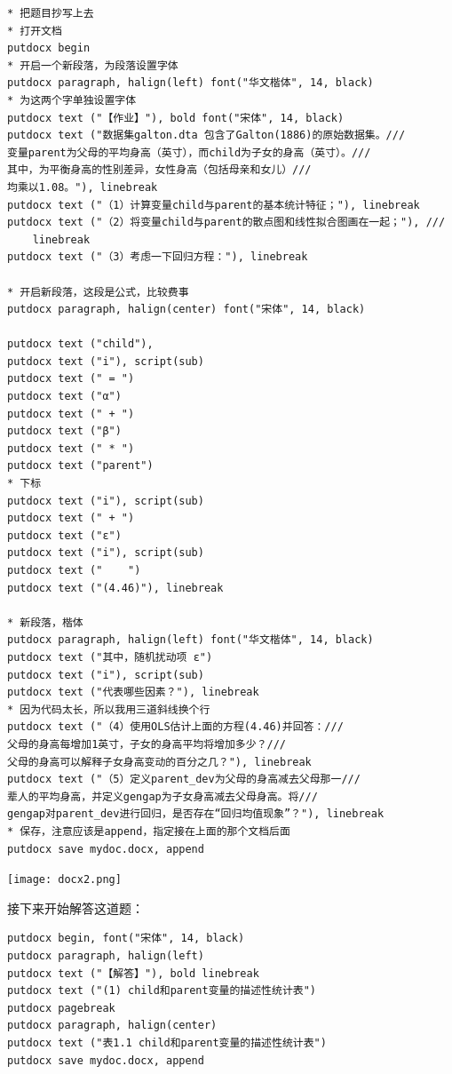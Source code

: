 \documentclass[cn,fancy,blue,11pt]{elegantbook}
\begin{document}
\begin{lstlisting}
* 把题目抄写上去
* 打开文档
putdocx begin
* 开启一个新段落，为段落设置字体
putdocx paragraph, halign(left) font("华文楷体", 14, black)
* 为这两个字单独设置字体
putdocx text ("【作业】"), bold font("宋体", 14, black)
putdocx text ("数据集galton.dta 包含了Galton(1886)的原始数据集。///
变量parent为父母的平均身高（英寸），而child为子女的身高（英寸）。///
其中，为平衡身高的性别差异，女性身高（包括母亲和女儿）///
均乘以1.08。"), linebreak
putdocx text ("（1）计算变量child与parent的基本统计特征；"), linebreak
putdocx text ("（2）将变量child与parent的散点图和线性拟合图画在一起；"), ///
    linebreak
putdocx text ("（3）考虑一下回归方程："), linebreak

* 开启新段落，这段是公式，比较费事
putdocx paragraph, halign(center) font("宋体", 14, black)

putdocx text ("child"),
putdocx text ("i"), script(sub)
putdocx text (" = ")
putdocx text ("α")
putdocx text (" + ")
putdocx text ("β")
putdocx text (" * ")
putdocx text ("parent")
* 下标
putdocx text ("i"), script(sub)
putdocx text (" + ")
putdocx text ("ε")
putdocx text ("i"), script(sub)
putdocx text ("    ")
putdocx text ("(4.46)"), linebreak

* 新段落，楷体
putdocx paragraph, halign(left) font("华文楷体", 14, black)
putdocx text ("其中，随机扰动项 ε")
putdocx text ("i"), script(sub)
putdocx text ("代表哪些因素？"), linebreak
* 因为代码太长，所以我用三道斜线换个行
putdocx text ("（4）使用OLS估计上面的方程(4.46)并回答：///
父母的身高每增加1英寸，子女的身高平均将增加多少？///
父母的身高可以解释子女身高变动的百分之几？"), linebreak
putdocx text ("（5）定义parent_dev为父母的身高减去父母那一///
辈人的平均身高，并定义gengap为子女身高减去父母身高。将///
gengap对parent_dev进行回归，是否存在“回归均值现象”？"), linebreak
* 保存，注意应该是append，指定接在上面的那个文档后面
putdocx save mydoc.docx, append
\end{lstlisting}

\noindent\texttt{[image: docx2.png]}

接下来开始解答这道题：

\begin{lstlisting}
putdocx begin, font("宋体", 14, black)
putdocx paragraph, halign(left)
putdocx text ("【解答】"), bold linebreak
putdocx text ("(1) child和parent变量的描述性统计表")
putdocx pagebreak
putdocx paragraph, halign(center)
putdocx text ("表1.1 child和parent变量的描述性统计表")
putdocx save mydoc.docx, append
\end{lstlisting}
\end{document}
